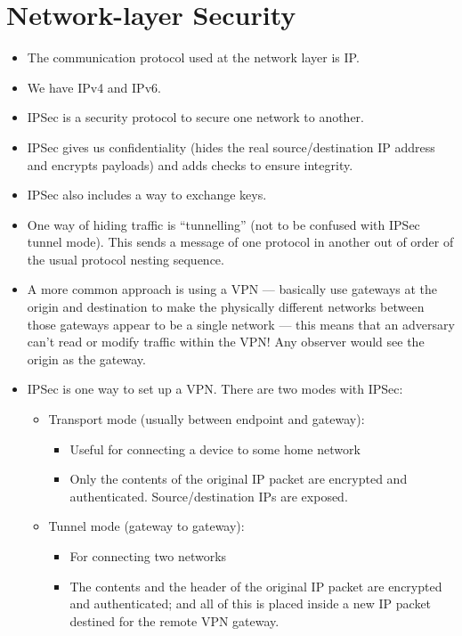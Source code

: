 \documentclass{article}
\begin{document}
\section{Network-layer Security}
\begin{itemize}
    \item The communication protocol used at the network layer is IP.
    \item We have IPv4 and IPv6.
    \item IPSec is a security protocol to secure one network to another.
    \item IPSec gives us confidentiality (hides the real source/destination IP address and encrypts payloads) and adds checks to ensure integrity.
    \item IPSec also includes a way to exchange keys.
    \item One way of hiding traffic is ``tunnelling'' (not to be confused with IPSec tunnel mode).  This sends a message of one protocol in another out of order of the usual protocol nesting sequence.
    \item A more common approach is using a VPN --- basically use gateways at the origin and destination to make the physically different networks between those gateways appear to be a single network --- this means that an adversary can't read or modify traffic within the VPN!  Any observer would see the origin as the gateway.
    \item IPSec is one way to set up a VPN.  There are two modes with IPSec:
        \begin{itemize}
            \item Transport mode (usually between endpoint and gateway):
                \begin{itemize}
                    \item Useful for connecting a device to some home network
                    \item Only the contents of the original IP packet are encrypted and authenticated.  Source/destination IPs are exposed.
                \end{itemize}
            \item Tunnel mode (gateway to gateway):
                \begin{itemize}
                    \item For connecting two networks
                    \item The contents and the header of the original IP packet are encrypted and authenticated; and all of this is placed inside a new IP packet destined for the remote VPN gateway.
                \end{itemize}
        \end{itemize}
\end{itemize}
\end{document}
